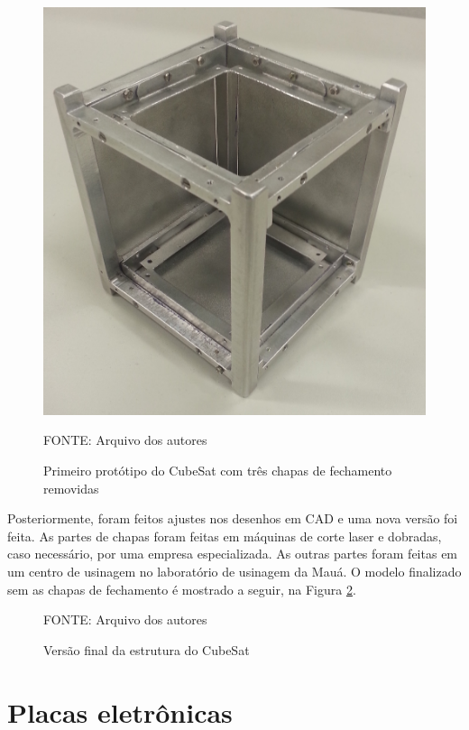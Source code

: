 \documentclass[
	12pt,				%
	openany,			%
	twoside,			%
	a4paper,			%
	english,			%
	french,				%
	spanish,			%
	brazil,				%
	oldfontcommands
	]{abntex2}
\begin{document}
\begin{figure}[ht]
	\caption{Primeiro protótipo do CubeSat com três chapas de fechamento removidas}
	\centering
	\includegraphics[width=0.6\linewidth]{./figs/PrototypeOne}
	
	\begin{small}
		FONTE: Arquivo dos autores
	\end{small}
	\label{fig:Protoone}
\end{figure}


Posteriormente, foram feitos ajustes nos desenhos em CAD e uma nova versão foi feita. As partes de chapas foram feitas em máquinas de corte laser e dobradas, caso necessário, por uma empresa especializada. As outras partes foram feitas em um centro de usinagem no laboratório de usinagem da Mauá. O modelo finalizado sem as chapas de fechamento é mostrado a seguir, na Figura \ref{fig:ProtoTwo}.

\begin{figure}[th]
	\caption{Versão final da estrutura do CubeSat}
	\centering
	
	\begin{small}
		FONTE: Arquivo dos autores
	\end{small}
	\label{fig:ProtoTwo}
\end{figure}

\section{Placas eletrônicas}



\end{document}
